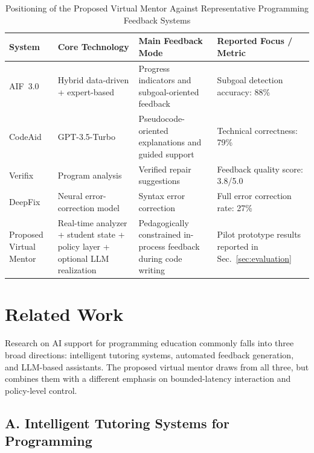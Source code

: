 \documentclass[conference]{IEEEtran}
\begin{document}
\begin{table}[t]
\centering
\caption{Positioning of the Proposed Virtual Mentor Against Representative Programming Feedback Systems}
\label{tab:feedback_comparison}
\renewcommand{\arraystretch}{1.2}
\begin{tabular}{p{2.5cm} p{3.5cm} p{4.8cm} p{3.9cm}}
\hline
\textbf{System} &
\textbf{Core Technology} &
\textbf{Main Feedback Mode} &
\textbf{Reported Focus / Metric} \\
\hline

AIF~3.0 \cite{AdaptiveImmediateFeedbackforBlockBasedProgramming} &
Hybrid data-driven + expert-based &
Progress indicators and subgoal-oriented feedback &
Subgoal detection accuracy: 88\% \\

CodeAid \cite{CodeAid} &
GPT-3.5-Turbo &
Pseudocode-oriented explanations and guided support &
Technical correctness: 79\% \\

Verifix \cite{NavigatingAutomatedFeedback} &
Program analysis &
Verified repair suggestions &
Feedback quality score: 3.8/5.0 \\

DeepFix \cite{NavigatingAutomatedFeedback} &
Neural error-correction model &
Syntax error correction &
Full error correction rate: 27\% \\

Proposed Virtual Mentor &
Real-time analyzer + student state + policy layer + optional LLM realization &
Pedagogically constrained in-process feedback during code writing &
Pilot prototype results reported in Sec.~\ref{sec:evaluation} \\

\hline
\end{tabular}
\end{table}

\section{Related Work}

Research on AI support for programming education commonly falls into three broad directions: intelligent tutoring systems, automated feedback generation, and LLM-based assistants. The proposed virtual mentor draws from all three, but combines them with a different emphasis on bounded-latency interaction and policy-level control.

\subsection*{A. Intelligent Tutoring Systems for Programming}
\end{document}
